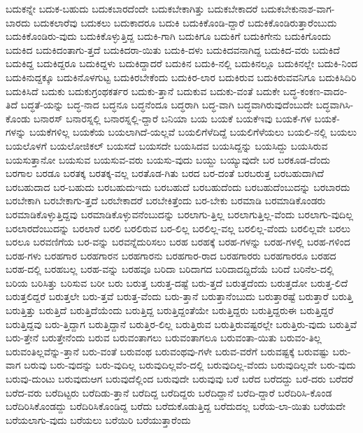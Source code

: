 {ಬದುಕನ್ನೇ
ಬದುಕ-ಬಹುದು
ಬದುಕಬಾರದೆಂದೇ
ಬದುಕಬೇಕಾಗಿತ್ತು
ಬದುಕಬೇಕಾದರೆ
ಬದುಕಬೇಕುನಾಶ-ವಾಗ-ಬಾರದು
ಬದುಕಲಾರೆವು
ಬದುಕಲು
ಬದುಕಾದರೂ
ಬದುಕಿ
ಬದುಕಿಕೊಂಡಿ-ದ್ದಾರೆ
ಬದುಕಿಕೊಂಡಿರುತ್ತಾರೆಂಬುದು
ಬದುಕಿಕೊಂಡಿರು-ವುದು
ಬದುಕಿಕೊಳ್ಳುತ್ತಿದ್ದ
ಬದುಕಿ-ಗಾಗಿ
ಬದುಕಿಗೂ
ಬದುಕಿಗೆ
ಬದುಕಿಗೇನು
ಬದುಕಿಗೊಂದು
ಬದುಕಿದ
ಬದುಕಿದಂತಾಗು-ತ್ತದೆ
ಬದುಕಿದರಾ-ಯಿತು
ಬದುಕಿ-ದಳು
ಬದುಕಿದವನಾಗಿದ್ದ
ಬದುಕಿದ-ವರು
ಬದುಕಿದೆ
ಬದುಕಿದ್ದ
ಬದುಕಿದ್ದರೂ
ಬದುಕಿದ್ದಳು
ಬದುಕಿದ್ದಾದರೆ
ಬದುಕಿನ
ಬದುಕಿ-ನಲ್ಲಿ
ಬದುಕಿನಲ್ಲೂ
ಬದುಕಿನಲ್ಲೇ
ಬದುಕಿ-ನಿಂದ
ಬದುಕಿನುದ್ದಕ್ಕೂ
ಬದುಕಿನೊಳಗುಟ್ಟ
ಬದುಕಿರಬೇಕೆಂದು
ಬದುಕಿರ-ಲಾರ
ಬದುಕಿರುವ
ಬದುಕಿರುವವನಿಗೂ
ಬದುಕಿಸಿದಿರಿ
ಬದುಕಿಸಿದೆ
ಬದುಕು
ಬದುಕುಗ್ರಂಥಕರ್ತರ
ಬದುಕು-ತ್ತಾನೆ
ಬದುಕುವ
ಬದುಕು-ವಂತೆ
ಬದುಕೇ
ಬದ್ಧ-ಕಂಕಣ-ವಾದಂ-ತಿದೆ
ಬದ್ಧತೆ-ಯನ್ನು
ಬದ್ಧ-ನಾದ
ಬದ್ಧನೂ
ಬದ್ಧನೆಂದೂ
ಬದ್ಧರಾಗಿ
ಬದ್ಧ-ವಾಗಿ
ಬದ್ಧವಾಗಿರುವುದೆಂಬುದೇ
ಬದ್ಧವಾಗಿಸಿ-ಕೊಂಡು
ಬನಾರಸ್
ಬನಾರಸ್ನಲ್ಲಿ
ಬನಾರಸ್ನಲ್ಲಿ-ದ್ದಾರೆ
ಬನಿಯಾ
ಬಯ
ಬಯಕೆ
ಬಯಕೆಇವು
ಬಯಕೆ-ಗಳ
ಬಯಕೆ-ಗಳನ್ನು
ಬಯಕೆಗಳಿಲ್ಲ
ಬಯಕೆಯ
ಬಯಲಾಗಿದೆ-ಯಲ್ಲವೆ
ಬಯಲಿಗೆಳೆದಿದ್ದೆ
ಬಯಲಿಗೆಳೆಯಲು
ಬಯಲಿ-ನಲ್ಲಿ
ಬಯಲು
ಬಯಲೊಳಗೆ
ಬಯಲೋಜಿಕಲ್
ಬಯಸದೆ
ಬಯಸದೇ
ಬಯಸಿದವ
ಬಯಸಿದ್ದನ್ನು
ಬಯಸಿದ್ದು
ಬಯಸಿರುವ
ಬಯಸುತ್ತಾನೋ
ಬಯಸುವ
ಬಯಸುವ-ವರು
ಬಯಸು-ವುದು
ಬಯ್ದು
ಬಯ್ಯುವುದೇ
ಬರ
ಬರಕೂಡ-ದೆಂದು
ಬರಗಾಲ
ಬರಡೂ
ಬರತಕ್ಕ
ಬರತಕ್ಕ-ವಲ್ಲ
ಬರತೊಡ-ಗಿತು
ಬರದ
ಬರ-ದಂತೆ
ಬರಬರುತ್ತ
ಬರಬಹುದಾಗಿದೆ
ಬರಬಹುದಾದ
ಬರ-ಬಹುದು
ಬರಬಹುದುಇದು
ಬರಬಹುದೆ
ಬರಬಹುದೆಂದು
ಬರಬಹುದೆಂಬುದನ್ನು
ಬರಬಾರದು
ಬರಬೇಕಾಗಿ
ಬರಬೇಕಾಗು-ತ್ತದೆ
ಬರಬೇಕಾದರೆ
ಬರಬೇಕಿತ್ತೆಂದು
ಬರ-ಬೇಕು
ಬರಮಾಡಿ
ಬರಮಾಡಿಕೊಂಡರು
ಬರಮಾಡಿಕೊಳ್ಳುತ್ತಿದ್ದವು
ಬರಮಾಡಿಕೊಳ್ಳುವನೆಂಬುದನ್ನು
ಬರಲಾಗು-ತ್ತಿಲ್ಲ
ಬರಲಾಗುತ್ತಿಲ್ಲ-ವೆಂದು
ಬರಲಾಗು-ವುದಿಲ್ಲ
ಬರಲಾರದೆಂಬುದನ್ನು
ಬರಲಾರೆ
ಬರಲಿ
ಬರಲಿರುವ
ಬರ-ಲಿಲ್ಲ
ಬರಲಿಲ್ಲ-ವಲ್ಲ
ಬರಲಿಲ್ಲ-ವೆಂದು
ಬರಲಿಲ್ಲವೇ
ಬರಲು
ಬರಲೂ
ಬರವಣಿಗೆಯ
ಬರ-ವನ್ನು
ಬರವನ್ನೆದುರಿಸಲು
ಬರಹ
ಬರಹಕ್ಕೆ
ಬರಹ-ಗಳನ್ನು
ಬರಹ-ಗಳಲ್ಲಿ
ಬರಹ-ಗಳಿಂದ
ಬರಹ-ಗಳು
ಬರಹಗಾರ
ಬರಹಗಾರನ
ಬರಹಗಾರನು
ಬರಹಗಾರ-ರಾದ
ಬರಹಗಾರರು
ಬರಹಗಾರರೂ
ಬರಹದ
ಬರಹ-ದಲ್ಲಿ
ಬರಹಬಲ್ಲ
ಬರಹ-ವನ್ನು
ಬರಹವೂ
ಬರಿದಾ
ಬರಿದಾಗದ
ಬರಿದಾದದ್ದಿದೆಯೆ
ಬರಿದೆ
ಬರಿನೆಲ-ದಲ್ಲಿ
ಬರಿಯ
ಬರಿಸಿತ್ತು
ಬರಿಸುವ
ಬರೀ
ಬರು
ಬರುತ್ತ
ಬರುತ್ತ-ದಷ್ಟೆ
ಬರು-ತ್ತದೆ
ಬರುತ್ತದೆಂದು
ಬರುತ್ತದೋ
ಬರುತ್ತ-ಲಿದೆ
ಬರುತ್ತಲಿದ್ದರೆ
ಬರುತ್ತಲೇ
ಬರು-ತ್ತವೆ
ಬರುತ್ತ-ವೆಂದು
ಬರು-ತ್ತಾನೆ
ಬರುತ್ತಾನೆಂಬುದು
ಬರುತ್ತಾರಷ್ಟೆ
ಬರುತ್ತಾರೆ
ಬರುತ್ತಿ
ಬರುತ್ತಿತ್ತು
ಬರುತ್ತಿದೆ
ಬರುತ್ತಿದೆಯೆಂದು
ಬರುತ್ತಿದ್ದ
ಬರುತ್ತಿದ್ದಂತೆಯೇ
ಬರುತ್ತಿದ್ದರು
ಬರುತ್ತಿದ್ದರುಈ
ಬರುತ್ತಿದ್ದರೆ
ಬರುತ್ತಿದ್ದವು
ಬರು-ತ್ತಿದ್ದಾಗ
ಬರುತ್ತಿದ್ದಾನೆ
ಬರುತ್ತಿರ-ಲಿಲ್ಲ
ಬರುತ್ತಿರುವ
ಬರುತ್ತಿರುವಷ್ಟರಲ್ಲೇ
ಬರುತ್ತಿರು-ವುದು
ಬರುತ್ತಿವೆ
ಬರು-ತ್ತೇನೆ
ಬರುತ್ತೇನೆಂದು
ಬರುವ
ಬರುವಂತಾಗಲು
ಬರುವಂತಾಗಲೂ
ಬರುವಂತಾ-ಯಿತು
ಬರುವಂ-ತಿಲ್ಲ
ಬರುವಂತಿಲ್ಲವೆನ್ನು-ತ್ತಾನೆ
ಬರು-ವಂತೆ
ಬರುವಂಥ
ಬರುವಂಥವು-ಗಳೇ
ಬರುವ-ವರೆಗೆ
ಬರುವಷ್ಟಕ್ಕೆ
ಬರುವಷ್ಟು
ಬರು-ವಾಗ
ಬರುವು
ಬರು-ವುದನ್ನು
ಬರು-ವುದಿಲ್ಲ
ಬರುವುದಿಲ್ಲವೆಂ-ದಲ್ಲಿ
ಬರುವುದಿಲ್ಲ-ವೆಂದು
ಬರುವುದಿಲ್ಲವೇ
ಬರು-ವುದು
ಬರುವು-ದುಂಟು
ಬರುವುದುಆಗ
ಬರುವುದೆಲ್ಲಿಂದ
ಬರುವುದೇ
ಬರುವುವು
ಬರೆ
ಬರೆದ
ಬರೆದದ್ದು
ಬರೆ-ದರು
ಬರೆದರೆ
ಬರೆದ-ವರು
ಬರೆದಿಟ್ಟರು
ಬರೆದಿಡು-ತ್ತಾನೆ
ಬರೆದಿದ್ದ
ಬರೆದಿದ್ದರು
ಬರೆದಿದ್ದಾನೆ
ಬರೆದಿ-ದ್ದಾರೆ
ಬರೆದಿರಿಸಿ-ಕೊಂಡ
ಬರೆದಿರಿಸಿಕೊಂಡದ್ದು
ಬರೆದಿರಿಸಿಕೊಂಡಿದ್ದ
ಬರೆದು
ಬರೆದುಕೊಡುತ್ತಿದ್ದ
ಬರೆದುದಲ್ಲ
ಬರೆಯ-ಲಾ-ಯಿತು
ಬರೆಯದೇ
ಬರೆಯಲಾಗು-ವುದು
ಬರೆಯಲು
ಬರೆಯಿರಿ
ಬರೆಯುತ್ತಾರೆಂದು
}
